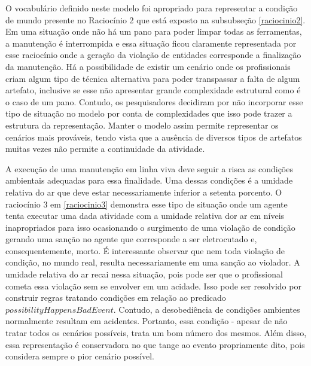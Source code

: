 O vocabulário definido neste modelo foi apropriado para representar a condição de mundo presente no Raciocínio 2 que está exposto na subsubseção \ref{raciocinio2}. 
Em uma situação onde não há um pano para poder limpar todas as ferramentas, a manutenção é interrompida e essa situação ficou claramente representada por 
esse raciocínio onde a geração da violação de entidades corresponde a finalização da manutenção. Há a possibilidade de existir um cenário onde os 
profissionais criam algum tipo de técnica alternativa para poder transpassar a falta de algum artefato, inclusive se esse não apresentar grande complexidade 
estrutural como é o caso de um pano. Contudo, os pesquisadores decidiram por não incorporar esse tipo de situação no modelo por conta de complexidades que 
isso pode trazer a estrutura da representação. Manter o modelo assim permite representar os cenários mais prováveis, tendo vista que a ausência de diversos 
tipos de artefatos muitas vezes não permite a continuidade da atividade.    

A execução de uma manutenção em linha viva deve seguir a risca as condições ambientais adequadas para essa finalidade. Uma dessas condições é a umidade 
relativa do ar que deve estar necessariamente inferior a setenta porcento. O raciocínio 3 em \ref{raciocinio3} demonstra esse tipo de situação onde um agente 
tenta executar uma dada atividade com a umidade relativa dor ar em níveis inapropriados para isso ocasionando o surgimento de uma violação de condição 
gerando uma sanção no agente que corresponde a ser eletrocutado e, consequentemente, morto. É interessante observar que nem toda violação de condição, 
no mundo real, resulta necessariamente em uma sanção ao violador. A umidade relativa do ar recai nessa situação, pois pode ser que o profissional cometa
essa violação sem se envolver em um acidade. Isso pode ser resolvido por construir regras tratando condições em relação ao predicado $possibilityHappensBadEvent$.
Contudo, a desobediência de condições ambientes normalmente resultam em acidentes. Portanto, essa condição - apesar de não tratar todos os cenários possíveis, 
trata um bom número dos mesmos. Além disso, essa representação é conservadora no que tange ao evento propriamente dito, pois considera sempre o pior 
cenário possível.

